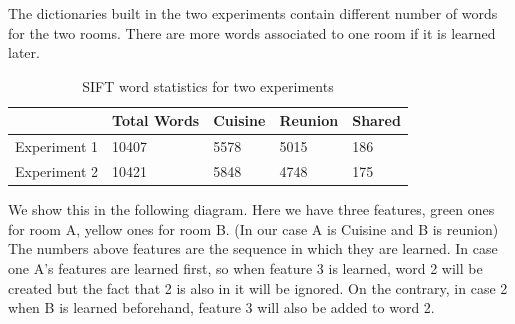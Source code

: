 \documentclass[a4paper]{scrartcl}
\begin{document}
The dictionaries built in the two experiments contain different number of words for the two rooms. There are more words associated to one room if it is learned later. 
\begin{table}[H]
\centering
\caption{SIFT word statistics for two experiments}
\label{words_sym}
\begin{tabular}{|l|l|l|l|l|}
\hline
             & Total Words & Cuisine & Reunion & Shared \\ \hline
Experiment 1 & 10407       & 5578    & 5015    & 186    \\ \hline
Experiment 2 & 10421       & 5848    & 4748    & 175    \\ \hline
\end{tabular}
\end{table}


We show this in the following diagram. Here we have three features, green ones for room A, yellow ones for room B. (In our case A is Cuisine and B is reunion) The numbers above features are the sequence in which they are learned. In case one A's features are learned first, so when feature 3 is learned, word 2 will be created but the fact that 2 is also in it will be ignored. On the contrary, in case 2 when B is learned beforehand, feature 3 will also be added to word 2.
\end{document}
